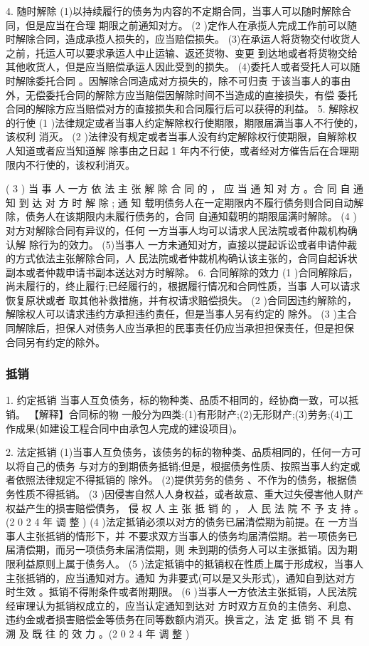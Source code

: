 \documentclass[UTF8,12pt]{ctexart}
\numberwithin{equation}{section} %
\numberwithin{figure}{section}
\numberwithin{table}{section}
\begin{document}
	4. 随时解除 (1)以持续履行的债务为内容的不定期合同，当事人可以随时解除合同，但是应当在合理 期限之前通知对方。
	(2 )定作人在承揽人完成工作前可以随时解除合同，造成承揽人损失的，应当赔偿损失。 (3)在承运人将货物交付收货人之前，托运人可以要求承运人中止运输、返还货物、变更 到达地或者将货物交给其他收货人，但是应当赔偿承运人因此受到的损失。 (4)委托人或者受托人可以随时解除委托合同 。因解除合同造成对方损失的，除不可归责 于该当事人的事由外，无偿委托合同的解除方应当赔偿因解除时间不当造成的直接损失，有偿 委托合同的解除方应当赔偿对方的直接损失和合同履行后可以获得的利益。
	5. 解除权的行使
	(1 )法律规定或者当事人约定解除权行使期限，期限届满当事人不行使的，该权利 消灭。
	(2 )法律没有规定或者当事人没有约定解除权行使期限，自解除权人知道或者应当知道解 除事由之日起 1 年内不行使，或者经对方催告后在合理期限内不行使的，该权利消灭。
	
	( 3 ) 当 事 人 一方 依 法 主 张 解 除 合 同 的 ， 应 当 通 知 对 方 。合 同 自 通 知 到 达 对 方 时 解 除 ; 通 知 载明债务人在一定期限内不履行债务则合同自动解除，债务人在该期限内未履行债务的，合同 自通知载明的期限届满时解除。
	(4 )对方对解除合同有异议的，任何 一方当事人均可以请求人民法院或者仲裁机构确认解 除行为的效力。
	(5)当事人 一方未通知对方，直接以提起诉讼或者申请仲裁的方式依法主张解除合同，人 民法院或者仲裁机构确认该主张的，合同自起诉状副本或者仲裁申请书副本送达对方时解除。 6. 合同解除的效力
	(1 )合同解除后，尚未履行的，终止履行;已经履行的，根据履行情况和合同性质，当事 人可以请求恢复原状或者 取其他补救措施，并有权请求赔偿损失。
	(2 )合同因违约解除的，解除权人可以请求违约方承担违约责任，但是当事人另有约定的 除外。
	(3 )主合同解除后，担保人对债务人应当承担的民事责任仍应当承担担保责任，但是担保 合同另有约定的除外。
	
	\subsubsection{抵销}
	1. 约定抵销 当事人互负债务，标的物种类、品质不相同的，经协商一致，可以抵销。
	【解释】合同标的物 一般分为四类:(1)有形財产;(2)无形财产;(3)劳务;(4)工 作成果(如建设工程合同中由承包人完成的建设项目)。
	
	2. 法定抵销 (1)当事人互负债务，该债务的标的物种类、品质相同的，任何一方可以将自己的债务 与对方的到期债务抵销;但是，根据债务性质、按照当事人约定或者依照法律规定不得抵销的 除外。
	(2)提供劳务的债务 、不作为的债务，根据债务性质不得抵销。
	(3 )因侵害自然人人身权益，或者故意、重大过失侵害他人财产权益产生的损害赔偿債务， 侵 权 人 主 张 抵 销 的 ， 人 民 法 院 不 予 支 持 。 (2 0 2 4 年 调 整 )
	(4 )法定抵销必须以对方的债务已届清偿期为前提。在 一方当事人主张抵销的情形下，并 不要求双方当事人的债务均届清偿期。若一项债务已届清偿期，而另一项债务未届清偿期，则 未到期的债务人可以主张抵销。因为期限利益原则上属于债务人。
	(5 )法定抵销中的抵销权在性质上属于形成权，当事人主张抵销的，应当通知对方。通知 为非要式(可以是又头形式)，通知自到达对方时生效 。抵销不得附条件或者附期限。
	(6 )当事人一方依法主张抵销，人民法院经审理认为抵销权成立的，应当认定通知到达对 方时双方互负的主债务、利息、违约金或者损害赔偿金等债务在同等数额内消灭。换言之，法 定 抵 销 不 具 有 溯 及 既 往 的 效 力 。(2 0 2 4 年 调 整 )
	
\end{document}
